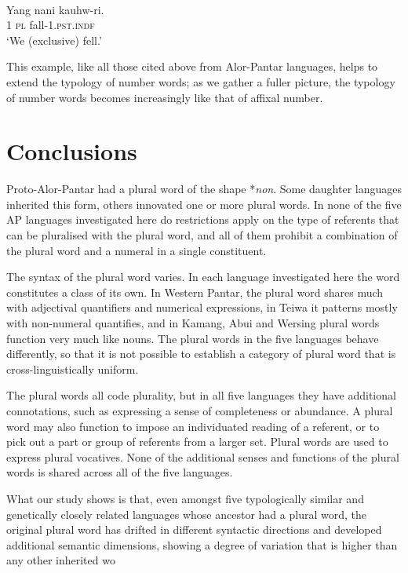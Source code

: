 \ea%
\label{ex:9:113}
 \\
\gll   Yang nani {kauhw-ri.}\\
  1 \textsc{pl} fall-1.\textsc{pst.indf}  \\
\glt `We (exclusive) fell.'
\z






This example, like all those cited above from Alor-Pantar languages, helps to extend the typology of number words; as we gather a fuller picture, the typology of number words becomes increasingly like that of affixal number.


\section{Conclusions} %
\label{sec:9:6}
Proto-Alor-Pantar had a plural word of the shape *\textit{non}. Some daughter languages inherited this form, others innovated one or more plural words. In none of the five AP languages investigated here do restrictions apply on the type of referents that can be pluralised with the plural word, and all of them prohibit a combination of the plural word and a numeral in a single constituent.

 The syntax of the plural word varies. In each language investigated here the word constitutes a class of its own. In Western Pantar, the plural word shares much with adjectival quantifiers and numerical expressions, in Teiwa it patterns mostly with non-numeral quantifies, and in Kamang, Abui and Wersing plural words function very much like nouns. The plural words in the five languages behave differently, so that it is not possible to establish a category of plural word that is cross-linguistically uniform.

 The plural words all code plurality, but in all five languages they have additional connotations, such as expressing a sense of completeness or abundance. A plural word may also function to impose an individuated reading of a referent, or to pick out a part or group of referents from a larger set. Plural words are used to express plural vocatives. None of the additional senses and functions of the plural words is shared across all of the five languages.

 What our study shows is that, even amongst five typologically similar and genetically closely related languages whose ancestor had a plural word, the original plural word has drifted in different syntactic directions and developed additional semantic dimensions, showing a degree of variation that is higher than any other inherited wo



